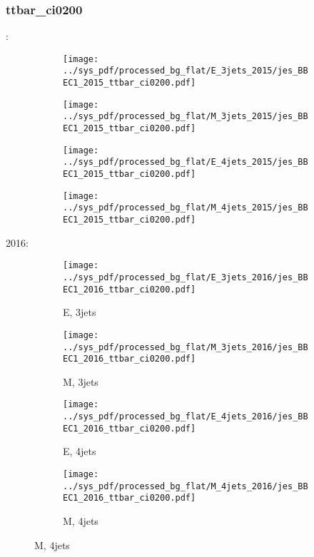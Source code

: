 \documentclass{beamer}
\begin{document}
\begin{frame}
\frametitle{ttbar_ci0200}
\fontsize{5}{1}:
\begin{figure}
\centering
\begin{subfigure}[b]{0.24\textwidth}
\texttt{[image: ../sys\_pdf/processed\_bg\_flat/E\_3jets\_2015/jes\_BBEC1\_2015\_ttbar\_ci0200.pdf]}
\end{subfigure}
\begin{subfigure}[b]{0.24\textwidth}
\texttt{[image: ../sys\_pdf/processed\_bg\_flat/M\_3jets\_2015/jes\_BBEC1\_2015\_ttbar\_ci0200.pdf]}
\end{subfigure}
\begin{subfigure}[b]{0.24\textwidth}
\texttt{[image: ../sys\_pdf/processed\_bg\_flat/E\_4jets\_2015/jes\_BBEC1\_2015\_ttbar\_ci0200.pdf]}
\end{subfigure}
\begin{subfigure}[b]{0.24\textwidth}
\texttt{[image: ../sys\_pdf/processed\_bg\_flat/M\_4jets\_2015/jes\_BBEC1\_2015\_ttbar\_ci0200.pdf]}
\end{subfigure}
\end{figure}
2016:
\begin{figure}
\centering
\begin{subfigure}[b]{0.24\textwidth}
\texttt{[image: ../sys\_pdf/processed\_bg\_flat/E\_3jets\_2016/jes\_BBEC1\_2016\_ttbar\_ci0200.pdf]}
\captionsetup{font=tiny}
\caption{E, 3jets}
\end{subfigure}
\begin{subfigure}[b]{0.24\textwidth}
\texttt{[image: ../sys\_pdf/processed\_bg\_flat/M\_3jets\_2016/jes\_BBEC1\_2016\_ttbar\_ci0200.pdf]}
\captionsetup{font=tiny}
\caption{M, 3jets}
\end{subfigure}
\begin{subfigure}[b]{0.24\textwidth}
\texttt{[image: ../sys\_pdf/processed\_bg\_flat/E\_4jets\_2016/jes\_BBEC1\_2016\_ttbar\_ci0200.pdf]}
\captionsetup{font=tiny}
\caption{E, 4jets}
\end{subfigure}
\begin{subfigure}[b]{0.24\textwidth}
\texttt{[image: ../sys\_pdf/processed\_bg\_flat/M\_4jets\_2016/jes\_BBEC1\_2016\_ttbar\_ci0200.pdf]}
\captionsetup{font=tiny}
\caption{M, 4jets}
\end{subfigure}
\end{figure}
\end{frame}
\end{document}

